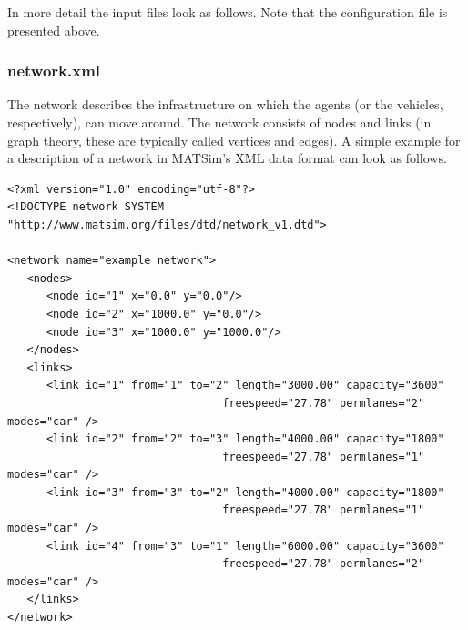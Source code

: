 In more detail the input files look as follows. Note that the configuration file is presented above.

\subsubsection{network.xml}
The network describes the infrastructure on which the agents (or the vehicles, respectively), can move around. The network consists of nodes and links (in graph theory, these are typically called vertices and edges). A simple example for a description of a network in MATSim's XML data format can look as follows.

\begin{lstlisting}
<?xml version="1.0" encoding="utf-8"?> 
<!DOCTYPE network SYSTEM "http://www.matsim.org/files/dtd/network_v1.dtd"> 
 
<network name="example network"> 
   <nodes> 
      <node id="1" x="0.0" y="0.0"/> 
      <node id="2" x="1000.0" y="0.0"/> 
      <node id="3" x="1000.0" y="1000.0"/> 
   </nodes> 
   <links> 
      <link id="1" from="1" to="2" length="3000.00" capacity="3600" 
                                 freespeed="27.78" permlanes="2" modes="car" /> 
      <link id="2" from="2" to="3" length="4000.00" capacity="1800" 
                                 freespeed="27.78" permlanes="1" modes="car" /> 
      <link id="3" from="3" to="2" length="4000.00" capacity="1800" 
                                 freespeed="27.78" permlanes="1" modes="car" /> 
      <link id="4" from="3" to="1" length="6000.00" capacity="3600" 
                                 freespeed="27.78" permlanes="2" modes="car" /> 
   </links> 
</network>
\end{lstlisting}

